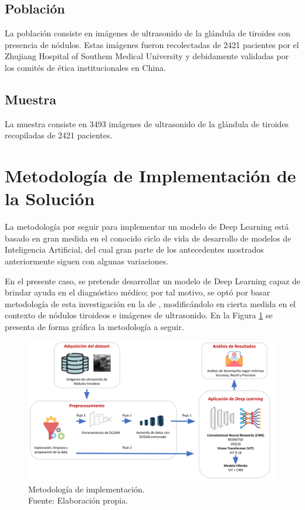 \subsection{Población}
La población consiste en imágenes de ultrasonido de la glándula de tiroides con presencia de nódulos. Estas imágenes fueron recolectadas de 2421 pacientes por el Zhujiang Hospital of Southem Medical University y debidamente validadas por los comités de ética institucionales en China.

\subsection{Muestra}
La muestra consiste en 3493 imágenes de ultrasonido de la glándula de tiroides recopiladas de 2421 pacientes.

\section{Metodología de Implementación de la Solución}
La metodología por seguir para implementar un modelo de Deep Learning está basado en gran medida en el conocido ciclo de vida de desarrollo de modelos de Inteligencia Artificial, del cual gran parte de los antecedentes mostrados anteriormente siguen con algunas variaciones. 

En el presente caso, se pretende desarrollar un modelo de Deep Learning capaz de brindar ayuda en el diagnóstico médico; por tal motivo, se optó por basar metodología de esta investigación en la de \cite{pr_monroy2021disvc}, modificándolo en cierta medida en el contexto de nódulos tiroideos e imágenes de ultrasonido. En la Figura \ref{3:fig301} se presenta de forma gráfica la metodología a seguir.

\begin{figure}[H]
	\begin{center}
		\includegraphics[width=1.00\textwidth]{3/figures/metod_classthy1.png}
		\caption[Metodología de implementación]{Metodología de implementación. \\
		Fuente: Elaboración propia.}
		\label{3:fig301}
	\end{center}
\end{figure}

